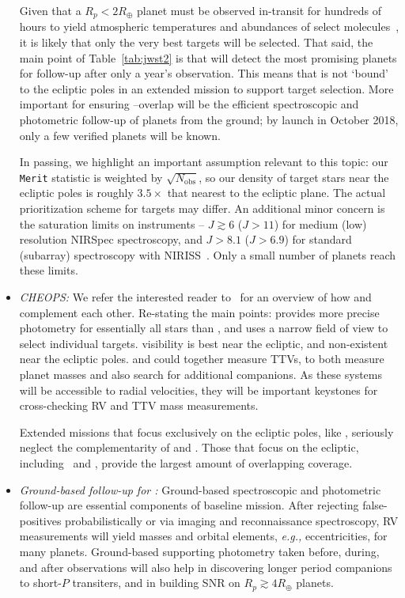 \begin{itemize}
	Given that a $R_p<2R_\oplus$ planet must be observed in-transit for hundreds of hours to yield atmospheric temperatures and abundances of select molecules~\citep{gillon_trappist1_2016,barstow_trappist_2016}, it is likely that only the very best targets will be selected.
	That said, the main point of Table~\ref{tab:jwst2} is that \tess will detect the most promising planets for \jwst follow-up after only a year's observation.
	This means that \tess is not `bound' to the ecliptic poles in an extended mission to support \jwsts target selection.
	More important for ensuring \jwst\!--\tess overlap will be the efficient spectroscopic and photometric follow-up of \tesss planets from the ground; by \jwsts launch in October 2018, only a few verified \tess planets will be known.
	
	In passing, we highlight an important assumption relevant to this topic: our \texttt{Merit} statistic is weighted by $\sqrt{N_\mathrm{obs}}$, so our density of target stars near the ecliptic poles is roughly $3.5\times$ that nearest to the ecliptic plane.
	The actual prioritization scheme for \tess targets may differ.
	An additional minor concern is the saturation limits on \jwsts instruments -- $J \gtrsim 6$ ($J>11$) for medium (low) resolution NIRSpec spectroscopy, and $J > 8.1$ ($J>6.9$) for standard (subarray) spectroscopy with NIRISS~\citep{beichman_observations_2014}.
	Only a small number of \tesss planets reach these limits.
	
	\item \textit{CHEOPS:}
	We refer the interested reader to~\citet{berta_cheops_2016} for an overview of how \tess and \cheops complement each other.
	Re-stating the main points:
	\cheops provides more precise photometry for essentially all stars than \tess, and uses a narrow field of view to select individual targets.
	\cheopss visibility is best near the ecliptic, and non-existent near the ecliptic poles.
	\tess and \cheops could together measure TTVs, to both measure planet masses and also search for additional companions. 
	As these systems will be accessible to radial velocities, they will be important keystones for cross-checking RV and TTV mass measurements.
	
	Extended missions that focus exclusively on the ecliptic poles, like \npole, seriously neglect the complementarity of \tess and \cheops\!.
	Those that focus on the ecliptic, including \elong\ and \eshort, provide the largest amount of overlapping coverage.
	
	
	\item \textit{Ground-based follow-up for \tess:}
	Ground-based spectroscopic and photometric follow-up are essential components of \tesss baseline mission.
	After rejecting false-positives probabilistically or via imaging and reconnaissance spectroscopy, RV measurements will yield masses and orbital elements, \textit{e.g.,} eccentricities, for many \tess planets.
	Ground-based supporting photometry taken before, during, and after \tesss observations will also help in discovering longer period companions to short-$P$ transiters, and in building SNR on $R_p\gtrsim4R_\oplus$ planets.
	

\end{itemize}
